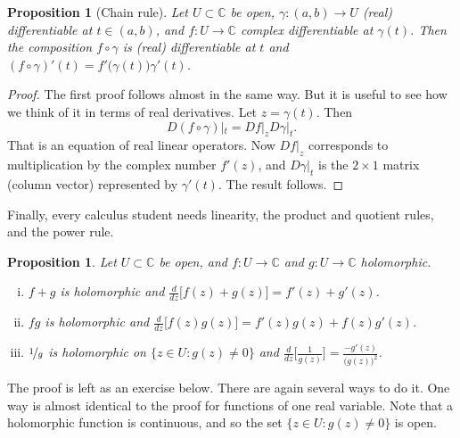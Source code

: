 \documentclass[12pt,openany]{book}
\newcommand{\C}{{\mathbb{C}}}
\theoremstyle{plain}
\newtheorem{prop}[thm]{Proposition}
\theoremstyle{remark}
\theoremstyle{definition}
\theoremstyle{exercise}
\theoremstyle{example}
\begin{document}
\begin{prop}[Chain rule]
%
\label{prop:chainrule2}%
Let $U \subset \C$ be open,
$\gamma \colon (a,b) \to U$ (real) differentiable at $t \in (a,b)$,
and $f \colon U \to \C$ complex differentiable at $\gamma(t)$.
Then the composition $f \circ \gamma$ is (real) differentiable
at $t$ and $(f \circ \gamma)'(t) = f'\bigl(\gamma(t)\bigr) \gamma'(t)$.
\end{prop}

\begin{proof}
The first proof follows almost in the same way.  But it is useful to see
how we think of it in terms of real derivatives.
Let $z = \gamma(t)$.  Then 
\begin{equation*}
D(f \circ \gamma)|_{t} =
Df|_z D\gamma|_{t} .
\end{equation*}
That is an equation of real linear operators.  Now $Df|_z$ corresponds
to multiplication by the complex number $f'(z)$, and $D\gamma|_{t}$
is the $2 \times 1$ matrix (column vector) represented by $\gamma'(t)$.
The result follows.
\end{proof}

Finally, every calculus student needs linearity, the product and quotient rules,
and the power rule.

\begin{prop} \label{prop:sumproddiv}
Let $U \subset \C$ be open, and $f \colon U \to \C$ and
$g \colon U \to \C$ holomorphic.
\begin{enumerate}[(i)]
\item
$f+g$ is holomorphic and $\frac{d}{dz}\bigl[ f(z)+g(z) \bigr] = f'(z) + g'(z)$.
\item
$fg$ is holomorphic and $\frac{d}{dz}\bigl[f(z) g(z) \bigr] = f'(z)g(z) + f(z)g'(z)$.
\item
$\nicefrac{1}{g}$ is holomorphic on $\bigl\{ z \in U : g(z) \neq 0 \bigr\}$ and
$\frac{d}{dz}\bigl[\frac{1}{g(z)}\bigr] = \frac{-g'(z)}{{\bigl(g(z)\bigr)}^2}$.
\end{enumerate}
\end{prop}

The proof is left as an exercise below.  There are again several ways
to do it.  One way is almost identical to the
proof for functions of one real variable.
Note that
a holomorphic function is continuous, and so the set
$\bigl\{ z \in U : g(z) \neq 0 \bigr\}$ is open.
\end{document}
